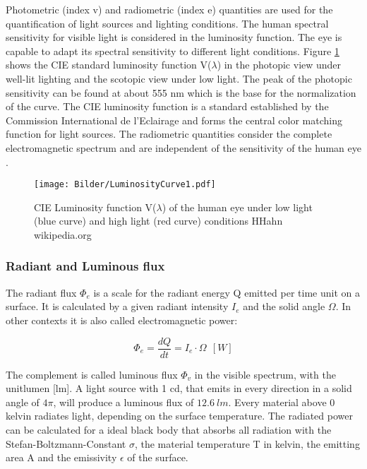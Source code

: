 Photometric (index v) and radiometric (index e) quantities are used for the quantification of light sources and lighting conditions. The human spectral sensitivity for visible light is considered in the luminosity function. The eye is capable to adapt its spectral sensitivity to different light conditions. Figure \ref{fig:luminosity} shows the CIE standard luminosity function V($\lambda$) in the photopic view under well-lit lighting and the scotopic view under low light. The peak of the photopic sensitivity can be found at about 555 nm which is the base for the normalization of the curve. The CIE luminosity function is a standard established by the Commission International de l'Eclairage and forms the central color matching function for light sources. The radiometric quantities consider the complete electromagnetic spectrum and are independent of the sensitivity of the human eye \cite{mccluney1994introduction}.

\begin{figure}[!h]
	\centering
	\texttt{[image: Bilder/LuminosityCurve1.pdf]}
	\caption{CIE Luminosity function V($\lambda$) of the human eye under low light (blue curve) and high light (red curve) conditions \tiny HHahn wikipedia.org \ccbysa}
	\label{fig:luminosity}
\end{figure} 

\subsubsection{Radiant and Luminous flux}

The radiant flux $\Phi_e$ is a scale for the radiant energy Q emitted per time unit on a surface. It is calculated by a given radiant intensity $I_e$ and the solid angle $\Omega$. In other contexts it is also called electromagnetic power: 

\begin{equation}
\Phi_e = \frac {dQ}{dt} = I_e \cdot \Omega ~~ [W]
\end{equation}
\medskip

The complement is called luminous flux $\Phi_v$ in the visible spectrum, with the unit\linebreak lumen [lm]. A light source with 1 cd, that emits in every direction in a solid angle of $4\pi$, will produce a luminous flux of $12.6~lm$. Every material above 0 kelvin radiates light, depending on the surface temperature. The radiated power can be calculated for a ideal black body that absorbs all radiation with the Stefan-Boltzmann-Constant $\sigma$, the material temperature T in kelvin, the emitting area A and the emissivity $\epsilon$ of the surface.

